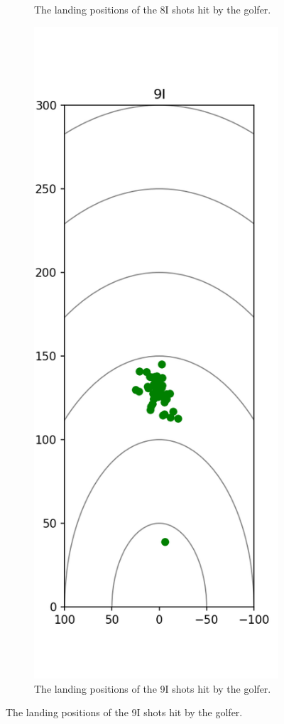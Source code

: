 \documentclass{kththesis}
\begin{document}
\begin{figure}
\begin{subfigure}{0.4\textwidth}
    \caption{The landing positions of the 8I shots hit by the golfer.}
    \label{fig:8I_shots}
    \end{subfigure}
    \begin{subfigure}{0.4\textwidth}
    \centering
    \includegraphics[height=0.4\textheight]{Shots/9I_shots.png} 
    \caption{The landing positions of the 9I shots hit by the golfer.}
    \label{fig:9I_shots}
    \end{subfigure}
\end{figure}
\end{document}
